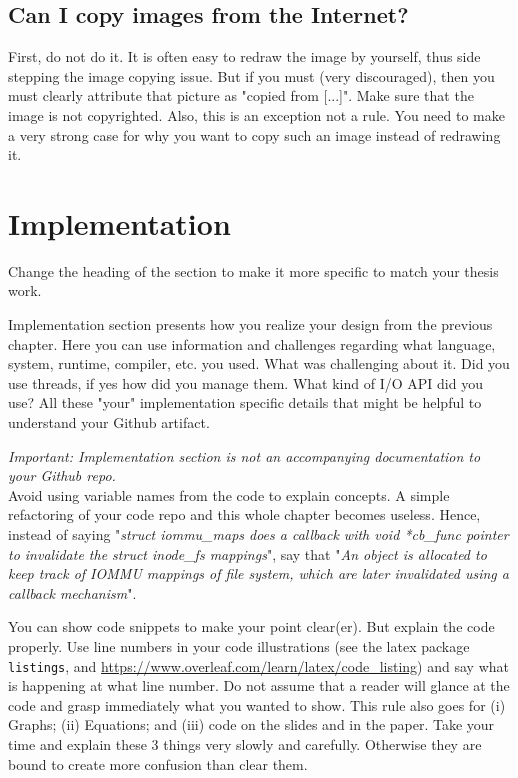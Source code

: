 \documentclass{article}
\begin{document}
\subsection*{Can I copy images from the Internet?}

First, do not do it. It is often easy to redraw the image by yourself, thus side stepping the image copying issue. But if you must (very discouraged), then you must clearly attribute that picture as "copied from [...]". Make sure that the image is not copyrighted. Also, this is an exception not a rule. You need to make a very strong case for why you want to copy such an image instead of redrawing it. 

\newpage 
\section{Implementation} 
Change the heading of the section to make it more specific to match your thesis work. 

Implementation section presents how you realize your design from the previous chapter. Here you can use information and challenges regarding what language, system, runtime, compiler, etc. you used. What was challenging about it. Did you use threads, if yes how did you manage them. What kind of I/O API did you use? All these "your" implementation specific details that might be helpful to understand your Github artifact. 

$ $\\
\textit{Important: Implementation section is not an accompanying documentation to your Github repo.} $ $\\

Avoid using variable names from the code to explain concepts. A simple refactoring of your code repo and this whole chapter becomes useless. Hence, instead of saying "\textit{struct iommu\_maps does a callback with void *cb\_func pointer to invalidate the struct inode\_fs mappings}", say that "\textit{An object is allocated to keep track of IOMMU mappings of file system, which are later invalidated using a callback mechanism}". 

You can show code snippets to make your point clear(er). But explain the code properly. Use line numbers in your code illustrations (see the latex package \texttt{listings}, and \url{https://www.overleaf.com/learn/latex/code_listing}) and say what is happening at what line number. Do not assume that a reader will glance at the code and grasp immediately what you wanted to show. This rule also goes for (i) Graphs; (ii) Equations; and (iii) code on the slides and in the paper. Take your time and explain these 3 things very slowly and carefully. Otherwise they are bound to create more confusion than clear them. 
\end{document}
